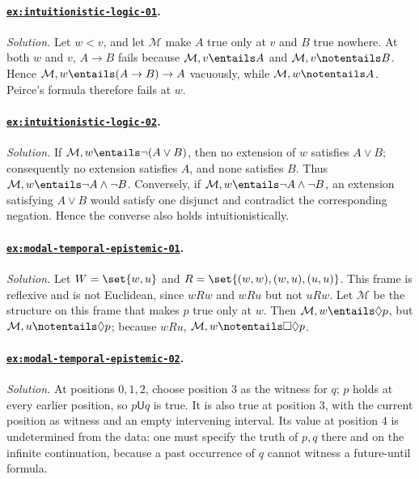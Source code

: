 \paragraph{\hyperref[ex:intuitionistic-logic-01]{\texttt{ex:intuitionistic-logic-01}}.}
\textit{Solution.}  Let \(w<v\), and let \(\mathcal M\) make \(A\) true only
at \(v\) and \(B\) true nowhere.  At both \(w\) and \(v\), \(A\to B\) fails
because \(\mathcal M,v\entails A\) and \(\mathcal M,v\notentails B\).
Hence \(\mathcal M,w\entails(A\to B)\to A\) vacuously, while
\(\mathcal M,w\notentails A\).  Peirce's formula therefore fails at \(w\).

\paragraph{\hyperref[ex:intuitionistic-logic-02]{\texttt{ex:intuitionistic-logic-02}}.}
\textit{Solution.}  If \(\mathcal M,w\entails\neg(A\lor B)\), then no
extension of \(w\) satisfies \(A\lor B\); consequently no extension satisfies
\(A\), and none satisfies \(B\).  Thus
\(\mathcal M,w\entails\neg A\land\neg B\).  Conversely, if
\(\mathcal M,w\entails\neg A\land\neg B\), an extension satisfying
\(A\lor B\) would satisfy one disjunct and contradict the corresponding
negation.  Hence the converse also holds intuitionistically.

\paragraph{\hyperref[ex:modal-temporal-epistemic-01]{\texttt{ex:modal-temporal-epistemic-01}}.}
\textit{Solution.}  Let \(W=\set{w,u}\) and
\(R=\set{(w,w),(w,u),(u,u)}\).  This frame is reflexive and is not Euclidean,
since \(wRw\) and \(wRu\) but not \(uRw\).  Let \(\mathcal M\) be the
structure on this frame that makes \(p\) true only at \(w\).
Then \(\mathcal M,w\entails\Diamond p\), but
\(\mathcal M,u\notentails\Diamond p\); because \(wRu\),
\(\mathcal M,w\notentails\Box\Diamond p\).

\paragraph{\hyperref[ex:modal-temporal-epistemic-02]{\texttt{ex:modal-temporal-epistemic-02}}.}
\textit{Solution.}  At positions \(0,1,2\), choose position \(3\) as the
witness for \(q\); \(p\) holds at every earlier position, so
\(p\mathbin{\mathsf U}q\) is true.  It is also true at position \(3\), with
the current position as witness and an empty intervening interval.  Its value
at position \(4\) is undetermined from the data: one must specify the truth of
\(p,q\) there and on the infinite continuation, because a past occurrence of
\(q\) cannot witness a future-until formula.

